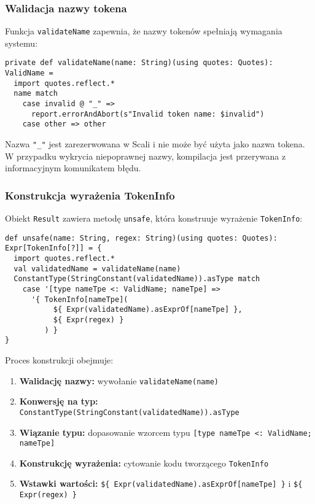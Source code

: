 \subsubsection{Walidacja nazwy tokena}
\label{subsubsec:cnp-name-validation}

Funkcja \texttt{validateName} zapewnia, że nazwy tokenów spełniają wymagania systemu:

\begin{lstlisting}
private def validateName(name: String)(using quotes: Quotes): ValidName =
  import quotes.reflect.*
  name match
    case invalid @ "_" =>
      report.errorAndAbort(s"Invalid token name: $invalid")
    case other => other
\end{lstlisting}

Nazwa \texttt{"\_"} jest zarezerwowana w Scali i nie może być użyta jako nazwa tokena. W przypadku wykrycia niepoprawnej nazwy, kompilacja jest przerywana z informacyjnym komunikatem błędu.

\subsubsection{Konstrukcja wyrażenia TokenInfo}
\label{subsubsec:cnp-tokeninfo-construction}

Obiekt \texttt{Result} zawiera metodę \texttt{unsafe}, która konstruuje wyrażenie \texttt{TokenInfo}:

\begin{lstlisting}
def unsafe(name: String, regex: String)(using quotes: Quotes): Expr[TokenInfo[?]] = {
  import quotes.reflect.*
  val validatedName = validateName(name)
  ConstantType(StringConstant(validatedName)).asType match
    case '[type nameTpe <: ValidName; nameTpe] =>
      '{ TokenInfo[nameTpe](
           ${ Expr(validatedName).asExprOf[nameTpe] },
           ${ Expr(regex) }
         ) }
}
\end{lstlisting}

Proces konstrukcji obejmuje:

\begin{enumerate}
    \item \textbf{Walidację nazwy:} wywołanie \texttt{validateName(name)}
    \item \textbf{Konwersję na typ:} \texttt{ConstantType(StringConstant(validatedName)).asType}
    \item \textbf{Wiązanie typu:} dopasowanie wzorcem typu \texttt{[type nameTpe <: ValidName; nameTpe]}
    \item \textbf{Konstrukcję wyrażenia:} cytowanie kodu tworzącego \texttt{TokenInfo}
    \item \textbf{Wstawki wartości:} \texttt{\$\{ Expr(validatedName).asExprOf[nameTpe] \}} i \texttt{\$\{ Expr(regex) \}}
\end{enumerate}

